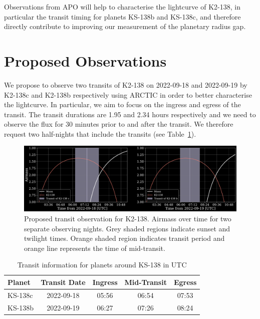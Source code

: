 \documentclass[twocolumn]{aastex631}
\begin{document}
Observations from APO will help to characterise the lightcurve of K2-138, in particular the transit timing for planets KS-138b and KS-138c, and therefore directly contribute to improving our measurement of the planetary radius gap.

\section{Proposed Observations}

We propose to observe two transits of K2-138 on 2022-09-18 and 2022-09-19 by K2-138c and K2-138b respectively using ARCTIC in order to better characterise the lightcurve. In particular, we aim to focus on the ingress and egress of the transit. The transit durations are 1.95 and 2.34 hours respectively and we need to observe the flux for 30 minutes prior to and after the transit. We therefore request two half-nights that include the transits (see Table~\ref{tab:transits}).

\begin{figure}[htb]
    \includegraphics[width=\columnwidth]{observable_transits.pdf}
    \caption{Proposed transit observation for K2-138. Airmass over time for two separate observing nights. Grey shaded regions indicate sunset and twilight times. Orange shaded region indicates transit period and orange line represents the time of mid-transit.}
\end{figure}

\begin{table}[htb]
    \centering
    \begin{tabular}{l|c|c|c|c} 
        \hline
        Planet & Transit Date & Ingress & Mid-Transit & Egress \\
        \hline\hline
        KS-138c & 2022-09-18 & 05:56 & 06:54 & 07:53 \\
        KS-138b & 2022-09-19 & 06:27 & 07:26 & 08:24 \\
        \hline
    \end{tabular}
    \caption{Transit information for planets around KS-138 in UTC}
    \label{tab:transits}
\end{table}
\end{document}

